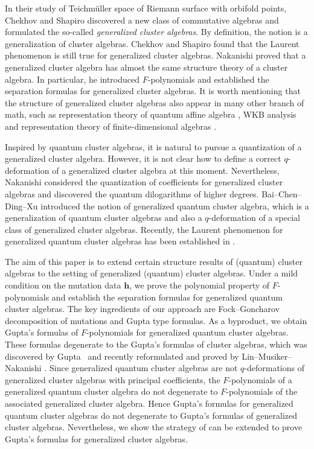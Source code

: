 \documentclass[10pt,a4paper]{amsart}
\numberwithin{equation}{section}
\begin{document}
In their study of Teichm\"{u}ller space of Riemann surface with orbifold points, Chekhov and Shapiro \cite{Chekhov_Shapiro} discovered a new class of commutative algebras and formulated the so-called {\it generalized cluster algebras}. By definition, the notion is a generalization of cluster algebras. Chekhov and Shapiro \cite{Chekhov_Shapiro} found that the Laurent phenomenon is still true for generalized cluster algebras. Nakanishi \cite{Nakanishi14} proved that a generalized cluster algebra has almost the same structure theory of a cluster algebra. In particular, he introduced $F$-polynomials and established the separation formulas for generalized cluster algebras. It is worth mentioning that the structure of generalized cluster algebras also appear in many other branch of math, such as representation theory of quantum affine algebra \cite{Gleitz2015}, WKB analysis \cite{Iwaki-Nakanishi2016} and representation theory of finite-dimensional algebras \cite{LFM18,LF-Velasco2018}.

Inspired by quantum cluster algebras, it is natural to pursue a quantization of a generalized cluster algebra. However, it is not clear how to define a correct $q$-deformation of a generalized cluster algebra at this moment. Nevertheless, Nakanishi \cite{Nakanishi-qgca} considered the quantization of coefficients for generalized cluster algebras and discovered the quantum dilogarithms of higher degrees. Bai--Chen--Ding--Xu \cite{BCDX2018} introduced the notion of generalized quantum cluster algebra, which is a generalization of quantum cluster algebras and also a $q$-deformation of a %
special class of generalized cluster algebras. Recently, the Laurent phenomenon for generalized quantum cluster algebras has been established in \cite{BCDX2023}.

The aim of this paper is to extend certain structure results of (quantum) cluster algebras to the setting of generalized (quantum) cluster algebras.
Under a mild condition on the mutation data $\mathbf{h}$, we prove the polynomial property %
of $F$-polynomials and establish the separation formulas for generalized quantum cluster algebras. The key ingredients of our approach are Fock--Goncharov decomposition of mutations and
Gupta type formulas.
As a byproduct, we obtain Gupta's formulas of $F$-polynomials for generalized quantum cluster algebras. These formulas degenerate to the Gupta's formulas of cluster algebras, which was discovered by Gupta~\cite{gupta2019} and recently reformulated and proved by Lin--Musiker--Nakanishi \cite{LMN2023}.
Since generalized quantum cluster algebras are not $q$-deformations of generalized cluster algebras with principal coefficients, the $F$-polynomials of a generalized quantum cluster algebra do not degenerate to $F$-polynomials of the associated generalized cluster algebra. Hence Gupta's formulas for generalized quantum cluster algebras do not degenerate to Gupta's formulas of generalized cluster algebras. Nevertheless, we show the strategy of \cite{LMN2023} can be extended to prove Gupta's formulas for generalized cluster algebras.
\end{document}
